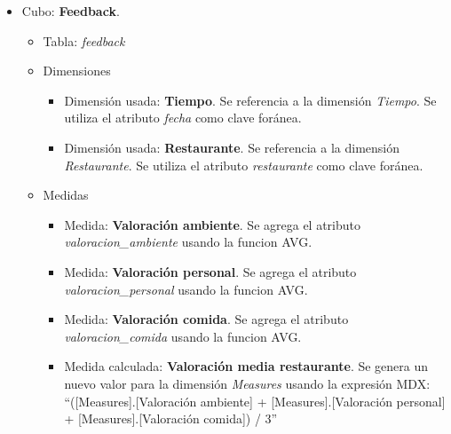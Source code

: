 \documentclass[12pt]{opticajnl}
\begin{document}
\begin{itemize}
\item Cubo: \textbf{Feedback}.
\begin{itemize}
\item Tabla: \textit{feedback}
\item Dimensiones
\begin{itemize}
\item Dimensión usada: \textbf{Tiempo}. Se referencia a la dimensión \textit{Tiempo}. Se utiliza el atributo \textit{fecha} como clave foránea.
\item Dimensión usada: \textbf{Restaurante}. Se referencia a la dimensión \textit{Restaurante}. Se utiliza el atributo \textit{restaurante} como clave foránea.
\end{itemize}
\item Medidas
\begin{itemize}
\item Medida: \textbf{Valoración ambiente}. Se agrega el atributo \textit{valoracion\_ambiente} usando la funcion AVG.
\item Medida: \textbf{Valoración personal}. Se agrega el atributo \textit{valoracion\_personal} usando la funcion AVG.
\item Medida: \textbf{Valoración comida}. Se agrega el atributo \textit{valoracion\_comida} usando la funcion AVG.
\item Medida calculada: \textbf{Valoración media restaurante}. Se genera un nuevo valor para la dimensión \textit{Measures} usando la expresión MDX: ``([Measures].[Valoración ambiente] + [Measures].[Valoración personal] + [Measures].[Valoración comida]) / 3''
\end{itemize}
\end{itemize}
\end{itemize}

\singlespacing
\end{document}
